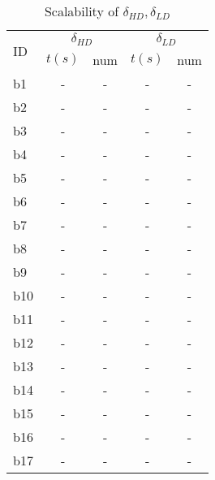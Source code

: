 \begin{longtable}{|l|c|c|c|c|}
\caption{\label{tab:distances}{Scalability of $\delta_{HD}, \delta_{LD}$}}\\
\hline
\multirow{2}{*}{ID}&\multicolumn{2}{c|}{$\delta_{HD}$}&\multicolumn{2}{c|}{$\delta_{LD}$}\\
\cline{2-5}
&$t(s)$&num&$t(s)$&num\\
\hline
b1&- & -&- & -
\\
b2&- & -&- & -
\\
b3&- & -&- & -
\\
b4&- & -&- & -
\\
b5&- & -&- & -
\\
b6&- & -&- & -
\\
b7&- & -&- & -
\\
b8&- & -&- & -
\\
b9&- & -&- & -
\\
b10&- & -&- & -
\\
b11&- & -&- & -
\\
b12&- & -&- & -
\\
b13&- & -&- & -
\\
b14&- & -&- & -
\\
b15&- & -&- & -
\\
b16&- & -&- & -
\\
b17&- & -&- & -
\\
\hline
\end{longtable}

